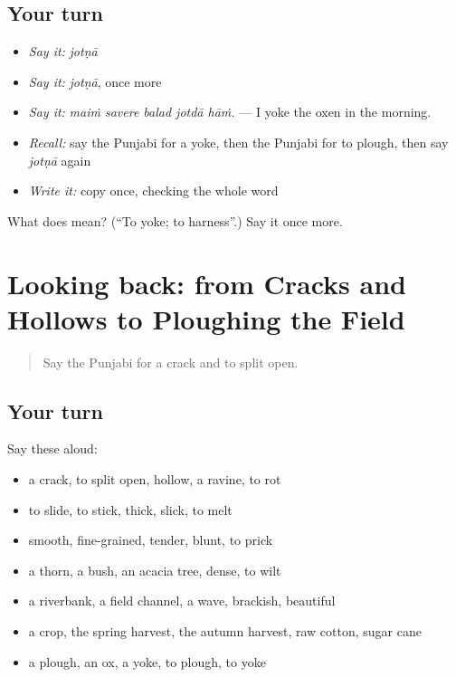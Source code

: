 \subsection*{Your turn}
\begin{itemize}
\raggedright
  \item \emph{Say it:} \emph{jotṇā}
  \item \emph{Say it:} \emph{jotṇā}, once more
  \item \emph{Say it:} \emph{maiṁ savere balad jotdā hāṁ.} — I yoke the oxen in the morning.
  \item \emph{Recall:} say the Punjabi for a yoke, then the Punjabi for to plough, then say \emph{jotṇā} again
  \item \emph{Write it:} copy \textbf{} once, checking the whole word
\end{itemize}

\begin{tcolorbox}[breakable,colback=teal!4,colframe=teal!35!black,title={Before you move on}]
What does  mean? (\textquotedblleft{}To yoke; to harness\textquotedblright{}.) Say it once more.
\end{tcolorbox}
\section[(dialogue)]{Looking back: from Cracks and Hollows to Ploughing the Field}

\label{lesson:PA-R301-review-295-301}



\begin{quote}
Say the Punjabi for a crack and to split open.
\end{quote}

\subsection*{Your turn}
Say these aloud:

\begin{itemize}
\raggedright
  \item a crack, to split open, hollow, a ravine, to rot
  \item to slide, to stick, thick, slick, to melt
  \item smooth, fine-grained, tender, blunt, to prick
  \item a thorn, a bush, an acacia tree, dense, to wilt
  \item a riverbank, a field channel, a wave, brackish, beautiful
  \item a crop, the spring harvest, the autumn harvest, raw cotton, sugar cane
  \item a plough, an ox, a yoke, to plough, to yoke
\end{itemize}

